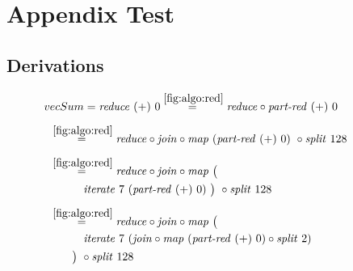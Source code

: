
\chapter{Appendix Test}
\label{chapter:AppendixA}
%


\section{Derivations}
\label{section:derivations}

\begin{figure*}[t]
\begin{align*}
  &\hspace{-1.5em}vecSum = \reduce\ (+)\ 0
%
  \overset{\ref{fig:algo:red}}{=\hspace{.2em}}
      \reduce \circ \partRed\ (+)\ 0\\[.5em]
%
  &\hspace{-2em}\quad\begin{aligned}
    &\overset{\ref{fig:algo:red}}{=\hspace{.2em}}
      \reduce \circ \join \circ \map\ (\partRed\ (+)\ 0)\ \circ \splitN\ 128
  \end{aligned}\\[.5em]
%
  &\hspace{-2em}\quad\begin{aligned}
    &\overset{\ref{fig:algo:red}}{=\hspace{.2em}}
      \reduce \circ \join \circ \map\ \big(\\
    &\qquad\quad\iterateN\ 7\ (\partRed\ (+)\ 0)\ \big)\ \circ \splitN\ 128
  \end{aligned}\\[.5em]
%
  &\hspace{-2em}\quad\begin{aligned}
    &\overset{\ref{fig:algo:red}}{=\hspace{.2em}}
      \reduce \circ \join \circ \map\ \big(\\
    &\qquad\quad\iterateN\ 7\ (\join \circ \map\ (\partRed\ (+)\ 0) \circ \splitN\ 2)\\
    &\qquad\big)\ \circ \splitN\ 128
  \end{aligned}\\[.5em]
%
  &\hspace{-2em}\quad\begin{aligned}

\end{aligned}
\end{align*}
\end{figure*}

